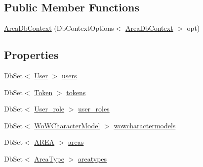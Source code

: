 \subsection*{Public Member Functions}
\begin{DoxyCompactItemize}
\item 
\mbox{\hyperlink{classArea_1_1DAT_1_1AreaDbContext_ae24424bd38ef16488f7cfe83cff8a01d}{Area\+Db\+Context}} (Db\+Context\+Options$<$ \mbox{\hyperlink{classArea_1_1DAT_1_1AreaDbContext}{Area\+Db\+Context}} $>$ opt)
\end{DoxyCompactItemize}
\subsection*{Properties}
\begin{DoxyCompactItemize}
\item 
Db\+Set$<$ \mbox{\hyperlink{classArea_1_1Models_1_1User}{User}} $>$ \mbox{\hyperlink{classArea_1_1DAT_1_1AreaDbContext_a70a40f34149640aa8dad936e92d94147}{users}}
\item 
Db\+Set$<$ \mbox{\hyperlink{classArea_1_1Models_1_1Token}{Token}} $>$ \mbox{\hyperlink{classArea_1_1DAT_1_1AreaDbContext_a57bfbc12f404c1d6665a8d9f59bfa635}{tokens}}
\item 
Db\+Set$<$ \mbox{\hyperlink{classArea_1_1Models_1_1User__role}{User\+\_\+role}} $>$ \mbox{\hyperlink{classArea_1_1DAT_1_1AreaDbContext_aadce9e078963a91065c5f084dcc4656c}{user\+\_\+roles}}
\item 
Db\+Set$<$ \mbox{\hyperlink{classArea_1_1Models_1_1WoWCharacterModel}{Wo\+W\+Character\+Model}} $>$ \mbox{\hyperlink{classArea_1_1DAT_1_1AreaDbContext_a6774df51b409ffb5ee27bf29186d4fe9}{wowcharactermodels}}
\item 
Db\+Set$<$ \mbox{\hyperlink{classArea_1_1Models_1_1AREA}{A\+R\+EA}} $>$ \mbox{\hyperlink{classArea_1_1DAT_1_1AreaDbContext_aa049cce613ea239b90deb127916071e2}{areas}}
\item 
Db\+Set$<$ \mbox{\hyperlink{classArea_1_1Models_1_1AreaType}{Area\+Type}} $>$ \mbox{\hyperlink{classArea_1_1DAT_1_1AreaDbContext_a2bf4466a5d72833e650cb3674e63e30c}{areatypes}}
\end{DoxyCompactItemize}


